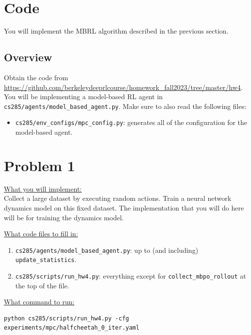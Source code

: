 \documentclass{article} %
\begin{document}
\newpage
\section{Code}

You will implement the MBRL algorithm described in the previous section.

\subsection{Overview}

Obtain the code from \url{https://github.com/berkeleydeeprlcourse/homework_fall2023/tree/master/hw4}. You will be implementing a model-based RL agent in \texttt{cs285/agents/model\_based\_agent.py}. Make sure to also read the following files:
\begin{itemize}
    \item \texttt{cs285/env\_configs/mpc\_config.py}: generates all of the configuration for the model-based agent.
\end{itemize}


\newpage
\section*{Problem 1}

\underline{What you will implement:}\\
Collect a large dataset by executing random actions. Train a neural network dynamics model on this fixed dataset. The implementation that you will do here will be for training the dynamics model.

\underline{What code files to fill in:}
\begin{enumerate}
    \item \verb+cs285/agents/model_based_agent.py+: up to (and including) \verb+update_statistics+.
    \item \verb+cs285/scripts/run_hw4.py+: everything except for \verb+collect_mbpo_rollout+ at the top of the file.
\end{enumerate}


\underline{What command to run:}
\begin{lstlisting}[escapechar=@]
python cs285/scripts/run_hw4.py -cfg experiments/mpc/halfcheetah_0_iter.yaml
\end{lstlisting}
\end{document}
